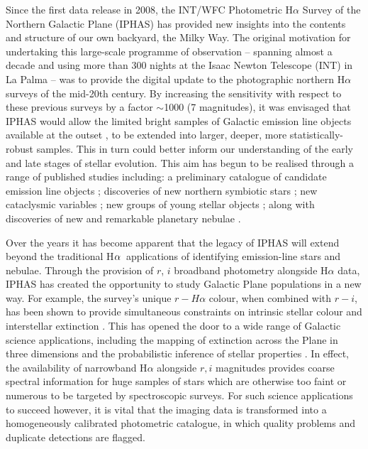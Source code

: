 \documentclass[useAMS,usenatbib]{mn2e}
\def\ha{\mbox{H$\rm \alpha$}}
\begin{document}
Since the first data release in 2008, 
the INT/WFC Photometric H$\alpha$ Survey 
of the Northern Galactic Plane (IPHAS)
has provided new insights into the contents and structure 
of our own backyard, the Milky Way. 
The original motivation for undertaking 
this large-scale programme of observation
-- spanning almost a decade 
and using more than 300 nights 
at the Isaac Newton Telescope (INT) in La Palma -- 
was to provide the digital update 
to the photographic northern H$\alpha$ surveys 
of the mid-20th century. 
By increasing the sensitivity 
with respect to these previous surveys 
by a factor $\sim$1000 (7 magnitudes), 
it was envisaged that IPHAS would allow 
the limited bright samples of Galactic emission line objects 
available at the outset \citep[e.g.][]{Kohoutek1999}, 
to be extended into larger, deeper, more statistically-robust samples.
This in turn could better inform our understanding 
of the early and late stages of stellar evolution. 
This aim has begun to be realised through a
range of published studies including: 
a preliminary catalogue of candidate emission line objects \citep{Witham2008};
discoveries of new northern symbiotic stars \citep{Corradi2008, Corradi2010}; 
new cataclysmic variables \citep{Witham2007}; 
new groups of young stellar objects \citep{Vink2008,Barentsen2011a};
along with discoveries of new and remarkable planetary nebulae 
\citep{Mampaso2006, Corradi2011, Viironen2011}.

Over the years it has become apparent that the legacy of IPHAS 
will extend beyond the traditional \ha\ applications 
of identifying emission-line stars and nebulae. 
Through the provision of $r$, $i$ broadband photometry 
alongside H$\alpha$ data,
IPHAS has created the opportunity 
to study Galactic Plane populations 
in a new way.
For example, the survey’s unique $r-H\alpha$ colour, 
when combined with $r-i$,
has been shown to provide simultaneous constraints 
on intrinsic stellar colour and interstellar extinction \citep{Drew2008}. 
This has opened the door 
to a wide range of Galactic science applications, 
including the mapping of extinction across the Plane in three dimensions
and the probabilistic inference of stellar properties
\citep{Sale2009, Sale2010, Giammanco2011, Sale2012, Barentsen2013}. 
In effect, the availability of narrowband H$\alpha$ 
alongside $r, i$ magnitudes
provides coarse spectral information for huge samples of stars 
which are otherwise too faint or numerous 
to be targeted by spectroscopic surveys.
For such science applications to succeed however, 
it is vital that the imaging data is transformed 
into a homogeneously calibrated photometric catalogue, 
in which quality problems 
and duplicate detections are flagged. 
\end{document}
